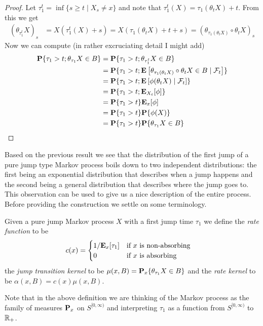 \begin{proof}
Let $\tau^t_1 = \inf \lbrace s \geq
t \mid X_s \neq x \rbrace$ and note that $\tau^t_1(X) =
\tau_1(\theta_t X) + t$.   From this we get
\begin{align*}
\left( \theta_{\tau^t_1}X \right)_s &= X(\tau^t_1(X) + s) =
X(\tau_1(\theta_tX) + t + s) = \left(\theta_{\tau_1(\theta_t X)} \circ \theta_tX
\right)_s
\end{align*} 
Now we can compute (in rather excruciating detail I might add)
\begin{align*}
\probability{\tau_1 > t ; \theta_{\tau_1}X \in B}
&=
\probability{\tau_1 > t ; \theta_{\tau^t_1}X \in B}\\
&=
\probability{\tau_1 > t ;
  \cexpectationlong{\mathcal{F}_t}{\theta_{\tau_1(\theta_t X)}\circ \theta_t X \in B}}\\
&=
\probability{\tau_1 > t ;
  \cexpectationlong{\mathcal{F}_t}{\phi(\theta_t X)}}\\
&=
\probability{\tau_1 > t ;
  \sexpectation{\phi}{X_t}}\\
&= \probability{\tau_1 > t } \sexpectation{\phi}{x}\\
&= \probability{\tau_1 > t } \probability{\phi(X)}\\
&= \probability{\tau_1 > t } \probability{\theta_{\tau_1} X \in B}\\
\end{align*}

\end{proof}

Based on the previous result we see that the distribution of the first
jump of a pure
jump type Markov process boils down to two independent distributions:
the first being an exponential distribution that describes when a jump
happens and the second being a general distribution that describes
where the jump goes to.  This observation can be used to give us a
nice description of the entire process.  Before providing the
construction we settle on some terminology.


\begin{defn}Given a pure jump Markov process $X$ with a first jump
  time $\tau_1$ we define the \emph{rate function} to be 
\begin{align*}
c(x) &=\begin{cases}
  1/\sexpectation{\tau_1}{x} & \text{if $x$ is non-absorbing}\\
0 & \text{if $x$ is absorbing}
\end{cases}
\end{align*}
 the \emph{jump transition kernel} to be
  $\mu(x,B) = \sprobability{\theta_{\tau_1}X \in B}{x}$ and the \emph{rate
    kernel} to be $\alpha(x,B) = c(x) \mu(x,B)$.  
\end{defn}
Note that in the above definition we are thinking of the Markov
process as the family of measures $\probabilityop_x$ on
$S^{[0,\infty)}$ and interpreting $\tau_1$ as a
function from $S^{[0,\infty)}$ to $\reals_+$.

